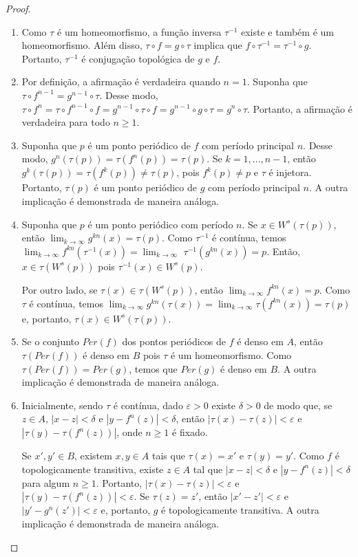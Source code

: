 \documentclass[a4paper, 12pt]{article}
\theoremstyle{definition}
\theoremstyle{plain}
\theoremstyle{plain}
\theoremstyle{plain}
\theoremstyle{definition}
\theoremstyle{remark}
\begin{document}
\begin{proof}
\begin{enumerate}
\item Como $\tau$ é um homeomorfismo, a função inversa $\tau^{-1}$ existe e também é um homeomorfismo. Além disso, $\tau \circ f = g \circ \tau$ implica que $f \circ \tau^{-1} = \tau^{-1} \circ g$. Portanto, $\tau^{-1}$ é conjugação topológica de $g$ e $f$.
\item Por definição, a afirmação é verdadeira quando $n = 1$. Suponha que $\tau \circ f^{n-1} = g^{n-1} \circ \tau$. Desse modo, $\tau \circ f^n = \tau \circ f^{n-1} \circ f = g^{n-1} \circ \tau \circ f = g^{n-1} \circ g \circ  \tau = g^n \circ \tau$. Portanto, a afirmação é verdadeira para todo $n \geq 1$.
\item Suponha que $p$ é um ponto periódico de $f$ com período principal $n$. Desse modo, $g^n(\tau(p)) = \tau(f^n(p)) = \tau(p)$. Se $k = 1, \dots, n-1$, então $g^k(\tau(p)) = \tau(f^k(p)) \neq \tau(p)$, pois $f^k(p) \neq p$ e $\tau$ é injetora. Portanto, $\tau(p)$ é um ponto periódico de $g$ com período principal $n$. A outra implicação é demonstrada de maneira análoga.
\item Suponha que $p$ é um ponto periódico com período $n$. Se $x \in W^s(\tau(p))$, então $\lim_{k \to \infty} g^{kn}(x) = \tau(p)$. Como $\tau^{-1}$ é contínua, temos $\lim_{k \to \infty} f^{kn}(\tau^{-1}(x)) = \lim_{k \to \infty} $ $ \tau^{-1}(g^{kn}(x))= p$. Então,  $x \in \tau(W^s(p))$ pois $\tau^{-1}(x) \in W^s(p)$.

Por outro lado, se $\tau(x) \in \tau(W^s(p))$, então $\lim_{k \to \infty} f^{kn}(x) = p$. Como $\tau$ é contínua, temos $\lim_{k \to \infty} g^{kn}(\tau(x)) = \lim_{k \to \infty} \tau(f^{kn}(x)) = \tau(p)$ e, portanto, $\tau(x) \in W^s(\tau(p))$.
\item Se o conjunto $Per(f)$ dos pontos periódicos de $f$ é denso em $A$, então $\tau(Per(f))$ é denso em $B$ pois $\tau$ é um homeomorfismo. Como $\tau(Per(f)) = Per(g)$, temos que $Per(g)$ é denso em $B$. A outra implicação é demonstrada de maneira análoga.
\item Inicialmente, sendo $\tau$ é contínua, dado $\varepsilon > 0$ existe $\delta > 0$ de modo que, se $z \in A$, $|x - z| < \delta$ e $|y - f^n(z)| < \delta$, então $|\tau(x) - \tau(z)| < \varepsilon$ e $|\tau(y) - \tau(f^n(z))|$, onde $n \geq 1$ é fixado.

Se $x', y' \in B$, existem $x, y \in A$ tais que $\tau(x) = x'$ e $\tau(y) =  y'$. Como $f$ é topologicamente transitiva, existe $z \in A$ tal que $|x - z| < \delta$ e $|y - f^n(z)| < \delta$ para algum $n \geq 1$. Portanto, $|\tau(x) - \tau(z)| < \varepsilon$ e $|\tau(y) - \tau(f^n(z))| < \varepsilon$. Se $\tau(z) = z'$, então $|x' - z'| < \varepsilon$ e $|y' - g^n(z')| < \varepsilon$ e, portanto, $g$ é topologicamente transitiva. A outra implicação é demonstrada de maneira análoga.
\end{enumerate}
\end{proof}
\end{document}
